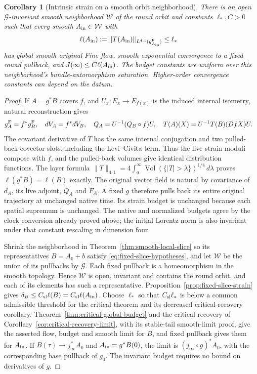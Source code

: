 \documentclass[11pt]{article}
\numberwithin{equation}{section}
\newtheorem{corollary}[theorem]{Corollary}
\theoremstyle{definition}
\theoremstyle{remark}
\begin{document}
\begin{corollary}[Intrinsic strain on a smooth orbit neighborhood]
\label{cor:intrinsic-orbit-budget}
There is an open $\mathscr G$-invariant smooth neighborhood
$\mathcal W$ of the round orbit and constants $\ell_*,C>0$
such that every smooth $A_{\rm in}\in\mathcal W$ with
\[
 \ell(A_{\rm in})
   :=\|T(A_{\rm in})\|_{L^{4,1}(g^{\rm F}_{A_{\rm in}})}
       \le\ell_*
\]
has global smooth original Fine flow, smooth exponential
convergence to a fixed round pullback, and
$J(\infty)\le C\ell(A_{\rm in})$.
The budget constants are uniform over this neighborhood's
bundle-automorphism saturation. Higher-order convergence
constants can depend on the datum.
\end{corollary}

\begin{proof}
If $A=g^*B$ covers $f$, and $U_x:E_x\to E_{f(x)}$
is the induced internal isometry, natural reconstruction
gives
\[
 g_A^{\rm F}=f^*g_B^{\rm F},\quad
 dV_A=f^*dV_B,\quad Q_A=U^{-1}(Q_B\circ f)U,\quad
 T(A)(X)=U^{-1}T(B)(DfX)U .
\]
The covariant derivative of $T$ has the same internal
conjugation and two pulled-back covector slots, including
the Levi--Civita term. Thus the live strain moduli
compose with $f$, and the pulled-back volumes give
identical distribution functions. The layer formula
$\|T\|_{4,1}=4\int_0^\infty
\operatorname{Vol}(\{|T|>\lambda\})^{1/4}\,d\lambda$
proves $\ell(g^*B)=\ell(B)$ exactly.
The original vector field is natural by covariance of
$d_A$, its live adjoint, $Q_A$ and $F_A$.
A fixed $g$ therefore pulls back its entire original
trajectory at unchanged native time. Its strain budget
is unchanged because each spatial supremum is unchanged.
The native and normalized budgets agree by the clock
conversion already proved above; the initial Lorentz
norm is also invariant under that constant rescaling
in dimension four.

Shrink the neighborhood in
Theorem~\ref{thm:smooth-local-slice} so its representatives
$B=A_0+b$ satisfy
\eqref{eq:fixed-slice-hypotheses}, and let $\mathcal W$
be the union of its pullbacks by $\mathscr G$.
Each fixed pullback is a homeomorphism in the smooth
topology. Hence $\mathcal W$ is open, invariant and
contains the round orbit, and each of its elements
has such a representative.
Proposition~\ref{prop:fixed-slice-strain} gives
$\delta_B\le C_{\rm sl}\ell(B)
=C_{\rm sl}\ell(A_{\rm in})$.
Choose $\ell_*$ so that $C_{\rm sl}\ell_*$
is below a common admissible threshold for the critical
theorem and its decreased critical-recovery corollary. Theorem~\ref{thm:critical-global-budget} and the
critical recovery of Corollary~\ref{cor:critical-recovery-limit},
with its stable-tail smooth-limit proof, give the asserted flow, budget and smooth limit
for $B$, and fixed pullback gives them for $A_{\rm in}$.
If $B(\tau)\to j_\infty^*A_0$ and $A_{\rm in}=g^*B(0)$,
the limit is $(j_\infty\circ g)^*A_0$, with the
corresponding base pullback of $g_0$.
The invariant budget requires no bound on derivatives of $g$.
\end{proof}
\end{document}
